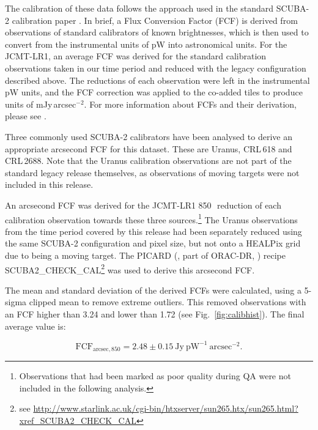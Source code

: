 \documentclass[twocolumn]{aastex6}
\newcommand{\ascl}[1]{\href{http://www.ascl.net/#1}{ascl:#1}}
\begin{document}
The calibration of these data follows the approach used in the
standard SCUBA-2 calibration paper \citep{Dempsey2013}. In brief, a
Flux Conversion Factor (FCF) is derived from observations of standard
calibrators of known brightnesses, which is then used to convert from
the instrumental units of pW into astronomical units. For the
JCMT-LR1, an average FCF was derived for the standard calibration
observations taken in our time period and reduced with the legacy
configuration described above.  The reductions of each observation
were left in the instrumental pW units, and the FCF correction was
applied to the co-added tiles to produce units of
mJy\,arcsec$^{-2}$. For more information about FCFs and their
derivation, please see \citet{Dempsey2013}.

Three commonly used SCUBA-2 calibrators have been analysed to derive
an appropriate arcsecond FCF for this dataset. These are Uranus,
CRL\,618 and CRL\,2688. Note that the Uranus calibration observations
are not part of the standard legacy release themselves, as
observations of moving targets were not included in this release.

An arcsecond FCF was derived for the JCMT-LR1 850\,\micron\ reduction
of each calibration observation towards these three
sources.\footnote{Observations that had been marked as poor quality
  during QA were not included in the following analysis.}  The Uranus
observations from the time period covered by this release had been
separately reduced using the same SCUBA-2 configuration and pixel
size, but not onto a HEALPix grid due to being a moving target. The
PICARD (\citealp{SUN265}, part of ORAC-DR, \citealp[][\ascl{1310.001}]{SUN230})
recipe SCUBA2\_CHECK\_CAL\footnote{see
  \url{http://www.starlink.ac.uk/cgi-bin/htxserver/sun265.htx/sun265.html?xref_SCUBA2_CHECK_CAL}}
was used to derive this arcsecond FCF.

The mean and standard deviation of the derived FCFs were calculated,
using a 5-sigma clipped mean to remove extreme outliers. This removed
observations with an FCF higher than 3.24 and lower than 1.72 (see
Fig.~\ref{fig:calibhist}). The final average value is:

\begin{equation}
\mathrm{FCF}_{\mathrm{arcsec},850} = 2.48 \pm 0.15\ \mathrm{Jy}\ \mathrm{pW}^{-1}\  \mathrm{arcsec}^{-2}.
\end{equation}
\end{document}
